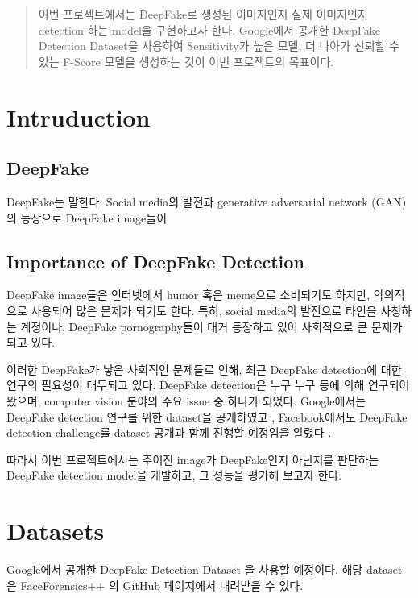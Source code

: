\documentclass{article}
\begin{document}
\begin{abstract}
이번 프로젝트에서는 DeepFake로 생성된 이미지인지 실제 이미지인지 detection 하는 model을 구현하고자 한다. Google에서 공개한 DeepFake Detection Dataset을 사용하여 Sensitivity가 높은 모델, 더 나아가 신뢰할 수 있는 F-Score 모델을 생성하는 것이 이번 프로젝트의 목표이다.
\end{abstract}

\section{Intruduction}

\subsection{DeepFake}

DeepFake는  말한다. Social media의 발전과 generative adversarial network (GAN)의 등장으로 DeepFake image들이 

\subsection{Importance of DeepFake Detection}

DeepFake image들은 인터넷에서 humor 혹은 meme으로 소비되기도 하지만, 악의적으로 사용되어 많은 문제가 되기도 한다. 특히, social media의 발전으로 타인을 사칭하는 계정이나, DeepFake pornography들이 대거 등장하고 있어 사회적으로 큰 문제가 되고 있다.

이러한 DeepFake가 낳은 사회적인 문제들로 인해, 최근 DeepFake detection에 대한 연구의 필요성이 대두되고 있다. DeepFake detection은 누구 누구 등에 의해 연구되어 왔으며, computer vision 분야의 주요 issue 중 하나가 되었다. Google에서는 DeepFake detection 연구를 위한 dataset을 공개하였고 \cite{googleblog}, Facebook에서도 DeepFake detection challenge를 dataset 공개과 함께 진행할 예정임을 알렸다 \cite{facebookblog}.

따라서 이번 프로젝트에서는 주어진 image가 DeepFake인지 아닌지를 판단하는 DeepFake detection model을 개발하고, 그 성능을 평가해 보고자 한다.

\section{Datasets}

Google에서 공개한 DeepFake Detection Dataset \cite{DDD_GoogleJigSaw2019} 을 사용할 예정이다. 해당 dataset은 FaceForensics++ \cite{roessler2019faceforensicspp}의 GitHub 
페이지에서 내려받을 수 있다.
\end{document}
